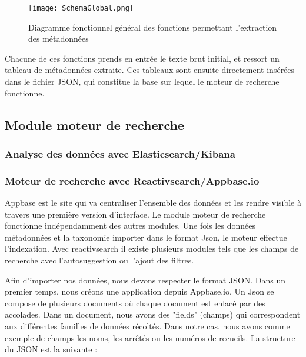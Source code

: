 \begin{figure}[h!]
  \centering
	\texttt{[image: SchemaGlobal.png]}
	\caption[]{Diagramme fonctionnel général des fonctions permettant l'extraction des métadonnées}
  \label{fig:globalMeta}
\end{figure}

Chacune de ces fonctions prends en entrée le texte brut initial, et ressort un tableau de métadonnées extraite.
Ces tableaux sont ensuite directement insérées dans le fichier JSON, qui constitue la base sur lequel le moteur de recherche fonctionne.


\subsection{Module moteur de recherche}
\subsubsection{Analyse des données avec Elasticsearch/Kibana}


\subsubsection{Moteur de recherche avec Reactivsearch/Appbase.io}
Appbase est le site qui va centraliser l'ensemble des données et les rendre visible à travers une première version d'interface.
Le module moteur de recherche fonctionne indépendamment des autres modules. Une fois les données métadonnées et la taxonomie importer dans le format Json, le moteur effectue l'indexation. Avec reactivsearch il existe plusieurs modules tels que les champs de recherche avec l'autosuggestion ou l'ajout des filtres.  

Afin d'importer nos données, nous devons respecter le format JSON.
Dans un premier temps, nous créons une application depuis Appbase.io. 
Un Json se compose de plusieurs documents où chaque document est enlacé par des accolades. Dans un document, nous avons des "fields" (champs) qui correspondent aux différentes familles de données récoltés. Dans notre cas, nous avons comme exemple de champs les noms, les arrêtés ou les numéros de recueils. La structure du JSON est la suivante :


